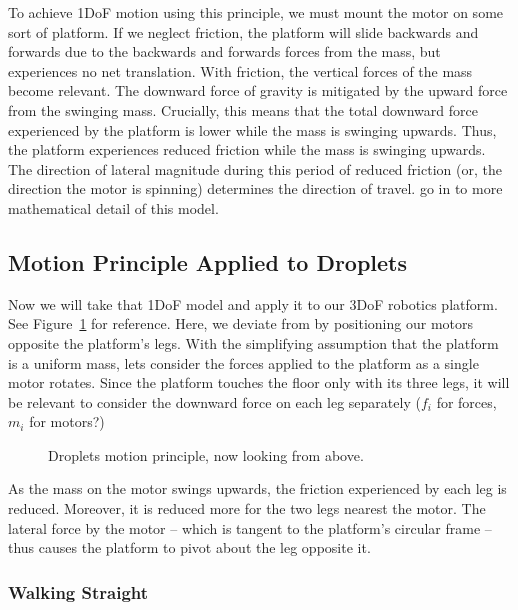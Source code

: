 \documentclass[letterpaper, 10pt, conference]{ieeeconf}
\begin{document}
To achieve 1DoF motion using this principle, we must mount the motor on some sort of platform. If we neglect friction, the platform will slide backwards and forwards due to the backwards and forwards forces from the mass, but experiences no net translation. With friction, the vertical forces of the mass become relevant. The downward force of gravity is mitigated by the upward force from the swinging mass. Crucially, this means that the total downward force experienced by the platform is lower while the mass is swinging upwards. Thus, the platform experiences reduced friction while the mass is swinging upwards. The direction of lateral magnitude during this period of reduced friction (or, the direction the motor is spinning) determines the direction of travel. \cite{Vartholomeos2005,Vartholomeos2006} go in to more mathematical detail of this model.

\subsection{Motion Principle Applied to Droplets}

Now we will take that 1DoF model and apply it to our 3DoF robotics platform. See Figure~\ref{dropletMotorDiagram} for reference. Here, we deviate from \cite{Vartholomeos2005} by positioning our motors opposite the platform's legs. With the simplifying assumption that the platform is a uniform mass, lets consider the forces applied to the platform as a single motor rotates. Since the platform touches the floor only with its three legs, it will be relevant to consider the downward force on each leg separately ($f_i$ for forces, $m_i$ for motors?)

\begin{figure}
\centering

\caption{Droplets motion principle, now looking from above.}
\label{dropletMotorDiagram}
\end{figure}

As the mass on the motor swings upwards, the friction experienced by each leg is reduced. Moreover, it is reduced more for the two legs nearest the motor. The lateral force by the motor -- which is tangent to the platform's circular frame -- thus causes the platform to pivot about the leg opposite it.

\subsubsection{Walking Straight}
\end{document}
